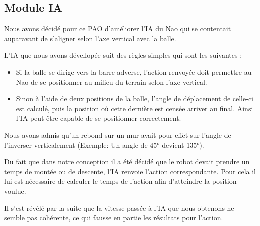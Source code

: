 \subsection{Module IA}
\label{sub:Module IA}
\par Nous avons décidé pour ce PAO d'améliorer l'IA du Nao qui se contentait
auparavant de s'aligner selon l'axe vertical avec la balle.
\par L'IA que nous avons dévellopée suit des règles simples qui sont les
suivantes :
\begin{itemize}
	\item Si la balle se dirige vers la barre adverse, l'action renvoyée doit
		permettre au Nao de se positionner au milieu du terrain selon l'axe
		vertical.
	\item Sinon à l'aide de deux positions de la balle, l'angle de déplacement
		de celle-ci est calculé, puis la position où cette dernière est censée
		arriver au final. Ainsi l'IA peut être capable de se positionner
		correctement.
\end{itemize}

\par Nous avons admis qu'un rebond sur un mur avait pour effet sur l'angle de
l'inverser verticalement (Exemple: Un angle de 45° devient 135°).
\par Du fait que dans notre conception il a été décidé que le robot devait
prendre un temps de montée ou de descente, l'IA renvoie l'action correspondante.
Pour cela il lui est nécessaire de calculer le temps de l'action afin
d'atteindre la position voulue.
\par Il s'est révélé par la suite que la vitesse passée à l'IA que nous obtenons ne
semble pas cohérente, ce qui fausse en partie les résultats pour l'action.
